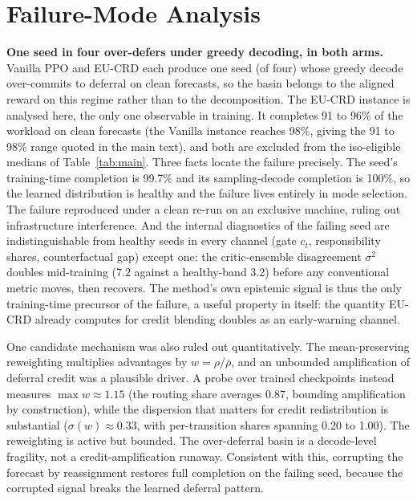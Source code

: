 \section{Failure-Mode Analysis}
\label{app:failure}

\textbf{One seed in four over-defers under greedy decoding, in both arms.} Vanilla PPO and EU-CRD each produce one seed (of four) whose greedy decode over-commits to deferral on clean forecasts, so the basin belongs to the aligned reward on this regime rather than to the decomposition. The EU-CRD instance is analysed here, the only one observable in training. It completes 91 to 96\% of the workload on clean forecasts (the Vanilla instance reaches 98\%, giving the 91 to 98\% range quoted in the main text), and both are excluded from the iso-eligible medians of Table~\ref{tab:main}. Three facts locate the failure precisely. The seed's training-time completion is 99.7\% and its sampling-decode completion is 100\%, so the learned distribution is healthy and the failure lives entirely in mode selection. The failure reproduced under a clean re-run on an exclusive machine, ruling out infrastructure interference. And the internal diagnostics of the failing seed are indistinguishable from healthy seeds in every channel (gate $c_t$, responsibility shares, counterfactual gap) except one: the critic-ensemble disagreement $\sigma^2$ doubles mid-training (7.2 against a healthy-band 3.2) before any conventional metric moves, then recovers. The method's own epistemic signal is thus the only training-time precursor of the failure, a useful property in itself: the quantity EU-CRD already computes for credit blending doubles as an early-warning channel.

One candidate mechanism was also ruled out quantitatively. The mean-preserving reweighting multiplies advantages by $w=\rho/\bar\rho$, and an unbounded amplification of deferral credit was a plausible driver. A probe over trained checkpoints instead measures $\max w \approx 1.15$ (the routing share averages 0.87, bounding amplification by construction), while the dispersion that matters for credit redistribution is substantial ($\sigma(w)\approx0.33$, with per-transition shares spanning 0.20 to 1.00). The reweighting is active but bounded. The over-deferral basin is a decode-level fragility, not a credit-amplification runaway. Consistent with this, corrupting the forecast by reassignment restores full completion on the failing seed, because the corrupted signal breaks the learned deferral pattern.

